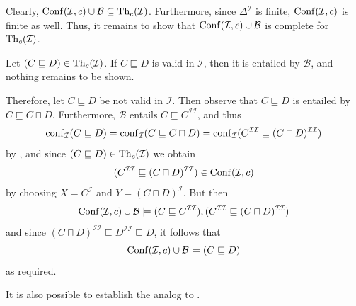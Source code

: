 \begin{Proof}
  Clearly, $\operatorname{Conf}(\mathcal{I}, c) \cup \mathcal{B} \subseteq \operatorname{Th}_c(\mathcal{I})$.
  Furthermore, since $\Delta^{\mathcal{I}}$ is finite, $\operatorname{Conf}(\mathcal{I}, c)$ is finite
  as well.  Thus, it remains to show that $\operatorname{Conf}(\mathcal{I}, c) \cup \mathcal{B}$ is
  complete for $\operatorname{Th}_c(\mathcal{I})$.

  Let $(C \sqsubseteq D) \in \operatorname{Th}_c(\mathcal{I})$.  If $C \sqsubseteq D$ is valid in
  $\mathcal{I}$, then it is entailed by $\mathcal{B}$, and nothing remains to be shown.

  Therefore, let $C \sqsubseteq D$ be not valid in $\mathcal{I}$.  Then observe that $C
  \sqsubseteq D$ is entailed by $C \sqsubseteq C \sqcap D$.  Furthermore, $\mathcal{B}$
  entails $C \sqsubseteq C^{\mathcal{I}\mathcal{I}}$, and thus
  \begin{equation*}
    \operatorname{conf}_{\mathcal{I}}( C \sqsubseteq D ) = \operatorname{conf}_{\mathcal{I}}( C \sqsubseteq C \sqcap D
    ) = \operatorname{conf}_{\mathcal{I}}( C^{\mathcal{I}\mathcal{I}} \sqsubseteq (C \sqcap
    D)^{\mathcal{I}\mathcal{I}} )
  \end{equation*}
  by , and since $(C \sqsubseteq D) \in
  \operatorname{Th}_c(\mathcal{I})$ we obtain
  \begin{equation*}
    (C^{\mathcal{I}\mathcal{I}} \sqsubseteq (C \sqcap D)^{\mathcal{I}\mathcal{I}}) \in
    \operatorname{Conf}(\mathcal{I}, c)
  \end{equation*}
  by choosing $X = C^{\mathcal{I}}$ and $Y = (C \sqcap D)^{\mathcal{I}}$.  But then
  \begin{equation*}
    \operatorname{Conf}(\mathcal{I}, c) \cup \mathcal{B} \models (C \sqsubseteq
    C^{\mathcal{I}\mathcal{I}}), (C^{\mathcal{I}\mathcal{I}} \sqsubseteq (C \sqcap
    D)^{\mathcal{I}\mathcal{I}})
  \end{equation*}
  and since $(C \sqcap D)^{\mathcal{I}\mathcal{I}} \sqsubseteq D^{\mathcal{I}\mathcal{I}}
  \sqsubseteq D$, it follows that
  \begin{equation*}
    \operatorname{Conf}(\mathcal{I}, c) \cup \mathcal{B} \models (C \sqsubseteq D)
  \end{equation*}
  as required.
\end{Proof}

It is also possible to establish the analog to .

